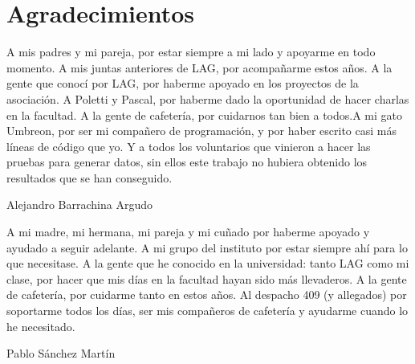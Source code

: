 
\chapter*{Agradecimientos}

A mis padres y mi pareja, por estar siempre a mi lado y apoyarme en todo momento. A mis juntas anteriores de LAG, por acompañarme estos años. A la gente que conocí por LAG, por haberme apoyado en los proyectos de la asociación. A Poletti y Pascal, por haberme dado la oportunidad de hacer charlas en la facultad. A la gente de cafetería, por cuidarnos tan bien a todos.A mi gato Umbreon, por ser mi compañero de programación, y por haber escrito casi más líneas de código que yo. Y a todos los voluntarios que vinieron a hacer las pruebas para generar datos, sin ellos este trabajo no hubiera obtenido los resultados que se han conseguido.

\begin{flushright}
    Alejandro Barrachina Argudo
\end{flushright}

A mi madre, mi hermana, mi pareja y mi cuñado por haberme apoyado y ayudado a seguir adelante.
A mi grupo del instituto por estar siempre ahí para lo que necesitase.
A la gente que he conocido en la universidad: tanto LAG como mi clase, por hacer que mis días en la facultad hayan sido más llevaderos.
A la gente de cafetería, por cuidarme tanto en estos años.
Al despacho 409 (y allegados) por soportarme todos los días, ser mis compañeros de cafetería y ayudarme cuando lo he necesitado.


\begin{flushright}
    Pablo Sánchez Martín
\end{flushright}






